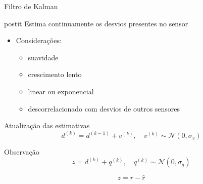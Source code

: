 \documentclass{beamer}
\begin{document}
\begin{frame}{Filtro de Kalman}

    \begin{beamercolorbox}[sep=5pt]{postit}
        Estima continuamente os desvios presentes no sensor
    \end{beamercolorbox}

    \begin{itemize}
        \item Considerações:
            \begin{itemize}
                \item suavidade
                \item crescimento lento
                \item linear ou exponencial
                \item descorrelacionado com desvios de outros sensores
            \end{itemize}
    \end{itemize}

    Atualização das estimativas
    $$
    {d}^{(k)} = {d}^{(k-1)} + {v}^{(k)}, \quad {v}^{(k)} \sim \mathcal{N} ({0}, \sigma_v)
    $$

    Observação
    $$
    {z} = {d}^{(k)} +{q}^{(k)}, \quad {q}^{(k)} \sim
    \mathcal{N} ({0}, \sigma_q)
    $$

    $$
    z = r - \hat{r}
    $$

    
\end{frame}
\end{document}
